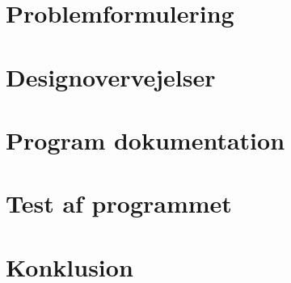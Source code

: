 \section{Problemformulering}
  

\section{Designovervejelser}
  

\section{Program dokumentation}
  

\section{Test af programmet}

\section{Konklusion}